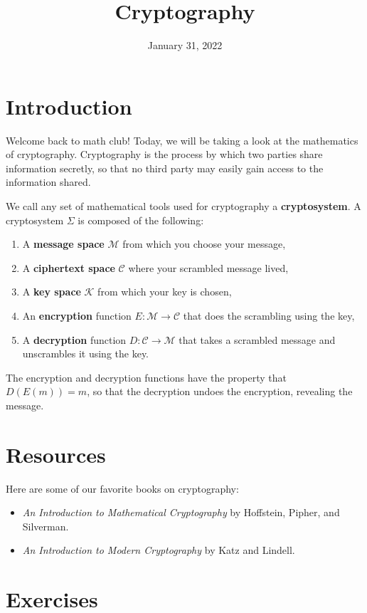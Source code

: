 \documentclass{article}
\title{Cryptography}
\author{}
\date{January 31, 2022}
\begin{document}
\section{Introduction}

    Welcome back to math club!
    Today, we will be taking a look at the mathematics of cryptography.
    Cryptography is the process by which two parties share information secretly, so that no third party may easily gain access to the information shared.

    \begin{definition}
        We call any set of mathematical tools used for cryptography a \textbf{cryptosystem}.
        A cryptosystem \(\Sigma\) is composed of the following:
        \begin{enumerate}
            \item A \textbf{message space} \(\mathcal{M}\) from which you choose your message,
            \item A \textbf{ciphertext space} \(\mathcal{C}\) where your scrambled message lived,
            \item A \textbf{key space} \(\mathcal{K}\) from which your key is chosen,
            \item An \textbf{encryption} function \(E:\mathcal{M}\to \mathcal{C}\) that does the scrambling using the key,
            \item A \textbf{decryption} function \(D:\mathcal{C}\to \mathcal{M}\) that takes a scrambled message and unscrambles it using the key.
        \end{enumerate}
        The encryption and decryption functions have the property that \(D(E(m))=m\), so that the decryption undoes the encryption, revealing the message.
    \end{definition}

\section{Resources}

    Here are some of our favorite books on cryptography:
    \begin{itemize}
        \item \textit{An Introduction to Mathematical Cryptography} by Hoffstein, Pipher, and Silverman.
        \item \textit{An Introduction to Modern Cryptography} by Katz and Lindell.
    \end{itemize}

\section{Exercises}
\end{document}
